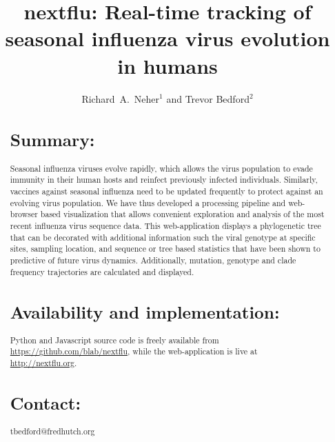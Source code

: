 \documentclass{bioinfo}
\begin{document}
\title[Tracking of seasonal influenza virus evolution]{nextflu: Real-time tracking of seasonal influenza virus evolution in humans}
\author{Richard~A.~Neher$^{1}$ and Trevor Bedford$^{2}$}
\address{$^{1}$Max Planck Institute for Developmental Biology, 72076 T\"ubingen, Germany, and $^{2}$Vaccine and Infectious Disease Division, Fred Hutchinson Cancer Research Center, Seattle, WA 98109, USA}


\maketitle



\begin{abstract} \section{Summary:} Seasonal influenza viruses evolve rapidly, which allows the virus population to evade immunity in their human hosts and reinfect previously infected individuals.
Similarly, vaccines against seasonal influenza need to be updated frequently to protect against an evolving virus population.
We have thus developed a processing pipeline and web-browser based visualization that allows convenient exploration and analysis of the most recent influenza virus sequence data.
This web-application displays a phylogenetic tree that can be decorated with additional information such the viral genotype at specific sites, sampling location, and sequence or tree based statistics that have been shown to predictive of future virus dynamics.
Additionally, mutation, genotype and clade frequency trajectories are calculated and displayed.

\section{Availability and implementation:} Python and Javascript source code is freely available from \url{https://github.com/blab/nextflu}, while the web-application is live at \url{http://nextflu.org}.

\section{Contact:} tbedford@fredhutch.org

\end{abstract}
\end{document}
